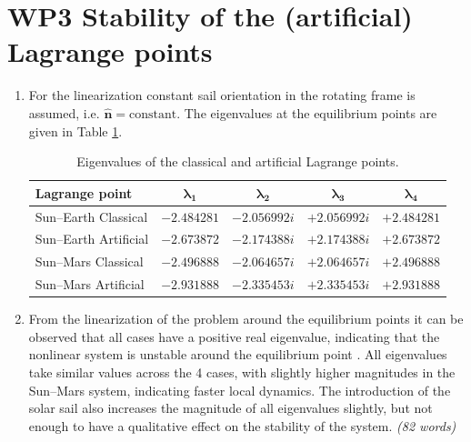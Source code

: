 \documentclass[a4paper,12pt]{article}
\begin{document}
\newpage
{}
\section*{WP3 Stability of the (artificial) Lagrange points}
\label{sec:wp3}

\begin{enumerate}
    \item[\textbf{3.1a}] For the linearization constant sail orientation in the rotating frame is assumed, i.e. $\mathbf{\hat{n}} = \text{constant}$. The eigenvalues at the equilibrium points are given in Table \ref{tab:eigenvalues}. 

    \vspace{1em}
    \begin{table}[htbp]
        \centering
        \caption{Eigenvalues of the classical and artificial Lagrange points.}        
        \label{tab:eigenvalues}
        \begin{tabular}{lcccc}
            \toprule
            \textbf{Lagrange point} & $\bm{\lambda_1}$ & $\bm{\lambda_2}$ & $\bm{\lambda_3}$ & $\bm{\lambda_4}$ \\
            \midrule
            Sun--Earth Classical  & $-2.484281$ & $-2.056992i$ & $+2.056992i$ & $+2.484281$ \\
            Sun--Earth Artificial & $-2.673872$ & $-2.174388i$ & $+2.174388i$ & $+2.673872$ \\
            Sun--Mars Classical   & $-2.496888$ & $-2.064657i$ & $+2.064657i$ & $+2.496888$ \\
            Sun--Mars Artificial  & $-2.931888$ & $-2.335453i$ & $+2.335453i$ & $+2.931888$ \\
            \bottomrule
        \end{tabular}
    \end{table}


    \item[\textbf{3.1b}] From the linearization of the problem around the equilibrium points it can be observed that all cases have a positive real eigenvalue, 
    indicating that the nonlinear system is unstable around the equilibrium point \cite{verhulst1996nonlinear}. All eigenvalues take similar values across the 
    4 cases, with slightly higher magnitudes in the Sun--Mars system, indicating faster local dynamics. The introduction of the solar sail also increases the 
    magnitude of all eigenvalues slightly, but not enough to have a qualitative effect on the stability of the system. \textit{(82 words)}


\end{enumerate}
\end{document}
